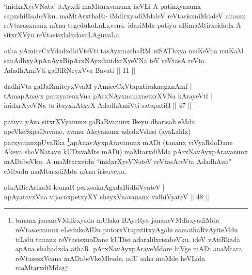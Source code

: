 \begin{artha}
`inidxrXyeVNata' itAyxdi maMtarxvanunx heVLi A patinxyanunx sapxshiRsabeVku. 
 maMtArxthaR:- iMdirxyadiMdaleV reVtasisxniMdaleV ninanx reVtasasxnunx 
nAnu tegedukoLuLxvenu. idariMda patiyu aBimaMtirxsidadx A sitxrXVyu 
reVtasisxlalxdavaLAguvaLu.
\end{artha}

\begin{shl}
atha yAmiceCxVdadxdhiVteVti tasAyxmathaRM niSAThxya muKeVna muKaM sanAdhxyApAnAyxBipArxNAyxdinidxrXyeVNa teV reVtasA reVta AdadhAmiVti gaBiRNeyxVva Bavati || 11 ||
\end{shl}


\begin{shl}
dadhiVta gaBaRmiteyxVvaM yAmiceCxVtapxtiraknagxnAmf | \\
tAmapAnayx parxyatenxVna pArxNAyxnamxnetxrXVNa kArayeVtf | \\
inidxrXyeVNa ta ituyxkAtxyX AdadhAmiVti satapxtiH \hfill|| 47 || 
\end{shl}

\begin{artha}
patiyu yAva sitxrXVyanunx gaBaRvanunx Ikeyu dharisali eMdu 
apeVkeSxpaDuvano, avanu Akeyanunx udedxVshisi (avaLalilx) 
parxyatanxpUvaRka \footnote[2]{tananx jananeVMdirxyada mUlaka BAyeRya 
jananeVMdirxyadiMda reVtasasxnunx eLedukoMDu putorxVtapxtitxyAgalu 
samathaRvAyiteMdu tiLidu tananx reVtasisxnoDane kUDisi 
adaralilxrisabeVku. ideV vAtiRkada apAna shabadxda athaR. 
pArxNavAyxpAraveMdare hiVge mADi anaMtara reVtasesxVcana 
mADabeVkeMbude, adU saha muMde heVLida maMtarxdiMda}apAnavAyxpAravanunx mADi (tananx 
viVyaRdoDane Akeya shoVNatavu kUDuvaMte mADi) maMtarxdiMda 
pArxNavAyxpAravanunx mADabeVku. A maMtarxvidu ``inidxrXyeVNateV reVtasAreVta AdadhAmi" eMbudu 
maMtarxdiMda nAnu irisuvenu.
\end{artha}


\begin{shl}
athA\s \s BicArikaM kamaR parxsaknAgxdaBidhiVyateV | \\
upAyatevxVna vijacnxpetxyXY sheyxVnavananx vidhiVyateV \hfill|| 48 || 
\end{shl}


